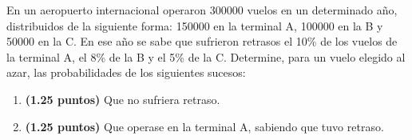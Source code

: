 
En un aeropuerto internacional operaron 300000 vuelos en un determinado año, distribuidos de la siguiente forma: 150000 en la terminal A, 100000 en la B y 50000 en la C. En ese año se sabe que sufrieron retrasos el 10\% de los vuelos de la terminal A, el 8\% de la B y el 5\% de la C. Determine, para un vuelo elegido al azar, las probabilidades de los siguientes sucesos:
\begin{enumerate}[label=\alph*)]
\item \textbf{(1.25 puntos)} Que no sufriera retraso.
\item \textbf{(1.25 puntos)} Que operase en la terminal A, sabiendo que tuvo retraso.
\end{enumerate}
